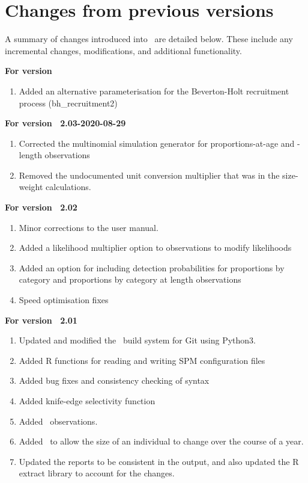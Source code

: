 \section{Changes from previous versions}

A summary of changes introduced into \SPM\ are detailed below. These include any incremental changes, modifications, and additional functionality.

\textbf{For version \SPM\ \VER}
\begin{enumerate}
  \item Added an alternative parameterisation for the Beverton-Holt recruitment process (bh\_recruitment2)
\end{enumerate}

\textbf{For version \SPM\ 2.03-2020-08-29}
\begin{enumerate}
  \item Corrected the multinomial simulation generator for proportions-at-age and -length observations
	\item Removed the undocumented unit conversion multiplier that was in the size-weight calculations.
\end{enumerate}

\textbf{For version \SPM\ 2.02}

\begin{enumerate}
  \item Minor corrections to the user manual.
	\item Added a likelihood multiplier option to observations to modify likelihoods
	\item Added an option for including detection probabilities for proportions by category and proportions by category at length observations
	\item Speed optimisation fixes
\end{enumerate}

\textbf{For version \SPM\ 2.01}

\begin{enumerate}
  \item Updated and modified the \SPM\ build system for Git using Python3.
  \item Added R functions for reading and writing SPM configuration files
	\item Added bug fixes and consistency checking of syntax
	\item Added knife-edge selectivity function
  \item Added\  observations.
  \item Added\  to allow the size of an individual to change over the course of a year.	
  \item Updated the reports to be consistent in the output, and also updated the R extract library to account for the changes.
\end{enumerate}


